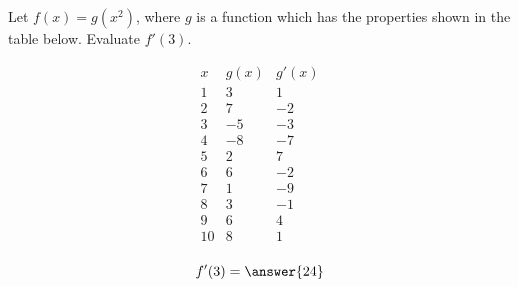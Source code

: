 \documentclass{ximera}
\author{Steven Gubkin}
\begin{document}
\begin{exercise}


Let $f(x) = g(x^2)$, where $g$ is a function which has the properties shown in the table below.  Evaluate $f'(3)$.

\[
\begin{array}{c|c|c}
 x & g(x) & g'(x)\\ \hline
1 & 3 & 1\\
2 & 7 & -2\\
3 & -5 & -3\\
4 & -8 & -7\\
5 & 2 & 7\\
6 & 6 & -2\\
7 & 1 & -9\\
8 & 3 & -1\\
9 & 6 & 4\\
10 & 8 & 1\\
\end{array}
\]

\begin{prompt}
	$$f'(3) = \answer{24}$$
\end{prompt}


\end{exercise}
\end{document}

